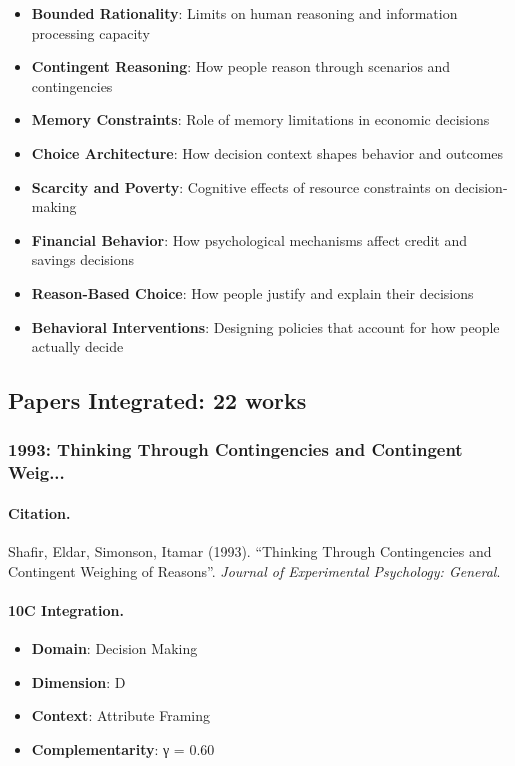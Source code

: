 \begin{itemize}
  \item \textbf{Bounded Rationality}: Limits on human reasoning and information processing capacity
  \item \textbf{Contingent Reasoning}: How people reason through scenarios and contingencies
  \item \textbf{Memory Constraints}: Role of memory limitations in economic decisions
  \item \textbf{Choice Architecture}: How decision context shapes behavior and outcomes
  \item \textbf{Scarcity and Poverty}: Cognitive effects of resource constraints on decision-making
  \item \textbf{Financial Behavior}: How psychological mechanisms affect credit and savings decisions
  \item \textbf{Reason-Based Choice}: How people justify and explain their decisions
  \item \textbf{Behavioral Interventions}: Designing policies that account for how people actually decide
\end{itemize}

\subsection{Papers Integrated: 22 works}


\subsubsection{1993: Thinking Through Contingencies and Contingent Weig...}

\paragraph{Citation.}
Shafir, Eldar, Simonson, Itamar (1993). ``Thinking Through Contingencies and Contingent Weighing of Reasons''. \textit{Journal of Experimental Psychology: General}.

\paragraph{10C Integration.}
\begin{itemize}[nosep]
  \item \textbf{Domain}: Decision Making
  \item \textbf{Dimension}: D
  \item \textbf{Context}: Attribute Framing
  \item \textbf{Complementarity}: γ = 0.60
\end{itemize}


